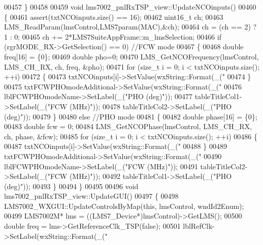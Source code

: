 \begin{DoxyCode}
{{{{{{{{{{{{{00457 \}
00458 
00459 \textcolor{keywordtype}{void} lms7002_pnlRxTSP_view::UpdateNCOinputs()
00460 \{
00461     assert(txtNCOinputs.size() == 16);
00462     uint16\_t ch;
00463     LMS_ReadParam(lmsControl,LMS7param(MAC),&ch);
00464     ch = (ch == 2) ? 1 : 0;
00465     ch += 2*LMS7SuiteAppFrame::m_lmsSelection;
00466     \textcolor{keywordflow}{if} (rgrMODE_RX->GetSelection() == 0) \textcolor{comment}{//FCW mode}
00467     \{
00468         \textcolor{keywordtype}{double} freq[16] = \{0\};
00469         \textcolor{keywordtype}{double} pho=0;
00470         LMS_GetNCOFrequency(lmsControl, LMS_CH_RX, ch, freq, &pho);
00471         \textcolor{keywordflow}{for} (\textcolor{keywordtype}{size\_t} i = 0; i < txtNCOinputs.size(); ++i)
00472         \{
00473             txtNCOinputs[i]->SetValue(wxString::Format(\_(\textcolor{stringliteral}{"%
00474         \}
00475         txtFCWPHOmodeAdditional->SetValue(wxString::Format(\_(\textcolor{stringliteral}{"%
00476         lblFCWPHOmodeName->SetLabel(\_(\textcolor{stringliteral}{"PHO (deg)"}));
00477         tableTitleCol1->SetLabel(\_(\textcolor{stringliteral}{"FCW (MHz)"}));
00478         tableTitleCol2->SetLabel(\_(\textcolor{stringliteral}{"PHO (deg)"}));
00479     \}
00480     \textcolor{keywordflow}{else} \textcolor{comment}{//PHO mode}
00481     \{
00482         \textcolor{keywordtype}{double} phase[16] = \{0\};
00483         \textcolor{keywordtype}{double} fcw = 0;
00484         LMS_GetNCOPhase(lmsControl, LMS_CH_RX, ch, phase, &fcw);
00485         \textcolor{keywordflow}{for} (\textcolor{keywordtype}{size\_t} i = 0; i < txtNCOinputs.size(); ++i)
00486         \{
00487             txtNCOinputs[i]->SetValue(wxString::Format(\_(\textcolor{stringliteral}{"%
00488         \}
00489         txtFCWPHOmodeAdditional->SetValue(wxString::Format(\_(\textcolor{stringliteral}{"%
00490         lblFCWPHOmodeName->SetLabel(\_(\textcolor{stringliteral}{"FCW (MHz)"}));
00491         tableTitleCol2->SetLabel(\_(\textcolor{stringliteral}{"FCW (MHz)"}));
00492         tableTitleCol1->SetLabel(\_(\textcolor{stringliteral}{"PHO (deg)"}));
00493     \}
00494 \}
00495 
00496 \textcolor{keywordtype}{void} lms7002_pnlRxTSP_view::UpdateGUI()
00497 \{
00498     LMS7002_WXGUI::UpdateControlsByMap(\textcolor{keyword}{this}, lmsControl, wndId2Enum);
00499     LMS7002M* lms = ((LMS7_Device*)lmsControl)->GetLMS();
00500     \textcolor{keywordtype}{double} freq = lms->GetReferenceClk_TSP(\textcolor{keyword}{false});
00501     lblRefClk->SetLabel(wxString::Format(\_(\textcolor{stringliteral}{"%
}}}}}}}}}}}}}}}}}}
\end{DoxyCode}

